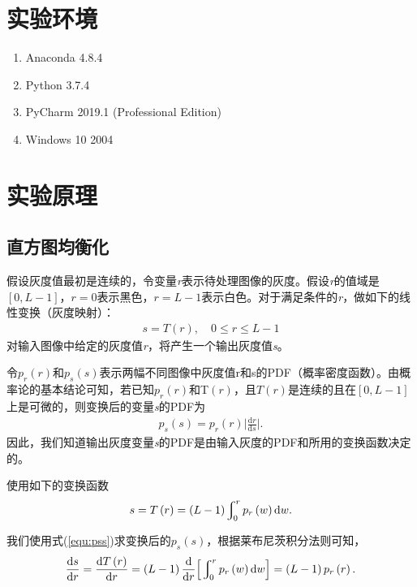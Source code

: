 \documentclass{hitreport}
\begin{document}
\section{实验环境}

\begin{enumerate}
\item Anaconda 4.8.4
\item Python 3.7.4
\item PyCharm 2019.1 (Professional Edition)
\item Windows 10 2004
\end{enumerate}

\section{实验原理}

\subsection{直方图均衡化}\label{sec:junhenghua}

假设灰度值最初是连续的，令变量\textit{r}表示待处理图像的灰度。假设\textit{r}的值域是$\left[0,L-1\right]$，$r=0$表示黑色，$r=L-1$表示白色。对于满足条件的\textit{r}，做如下的线性变换（灰度映射）：
\begin{align}
s=T\left(r\right),\quad 0\le r\le L-1
\end{align}
对输入图像中给定的灰度值\textit{r}，将产生一个输出灰度值\textit{s}。

令$p_r\left(r\right)$和$p_s\left(s\right)$表示两幅不同图像中灰度值r和s的PDF（概率密度函数）。由概率论的基本结论可知，若已知$p_r\left(r\right)$和T$\left(r\right)$，且$T\left(r\right)$是连续的且在$\left[0,L-1\right]$上是可微的，则变换后的变量\textit{s}的PDF为
\begin{align}\label{equ:pss}
p_s\left(s\right)=p_r\left(r\right)\Big|\frac{\mathrm{d}r}{\mathrm{d}s}\Big|.
\end{align}
因此，我们知道输出灰度变量\textit{s}的PDF是由输入灰度的PDF和所用的变换函数决定的。

使用如下的变换函数
\begin{align}\label{equ:trans}
s=T\left(r\right)=\left(L-1\right)\varint\nolimits_{0}^{r}p_r\left(w\right)\mathrm{d}w.
\end{align}

我们使用式(\ref{equ:pss})求变换后的$p_s\left(s\right)$，根据莱布尼茨积分法则可知，
\begin{align}
\frac{\mathrm{d}s}{\mathrm{d}r} = \frac{\mathrm{d} T\left(r\right)}{\mathrm{d}r} = \left(L-1\right)\frac{\mathrm{d}}{\mathrm{d}r}\Big[\varint\nolimits_{0}^{r}p_r\left(w\right)\mathrm{d}w\Big] = \left(L-1\right)p_r\left(r\right).
\end{align}
\end{document}
